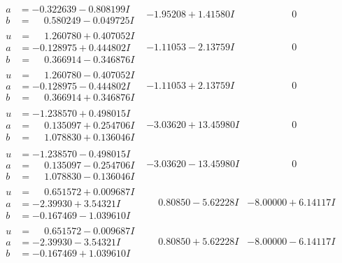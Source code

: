 \documentclass[1p]{elsarticle_modified}
\theoremstyle{definition}
\begin{document}
$$\begin{array}{c|c|c}
\begin{aligned}
a &= -0.322639 - 0.808199 I \\
b &= \phantom{-}0.580249 - 0.049725 I\end{aligned}
 & -1.95208 + 1.41580 I & \phantom{-0.000000 } 0 \\ \hline\begin{aligned}
u &= \phantom{-}1.260780 + 0.407052 I \\
a &= -0.128975 + 0.444802 I \\
b &= \phantom{-}0.366914 - 0.346876 I\end{aligned}
 & -1.11053 - 2.13759 I & \phantom{-0.000000 } 0 \\ \hline\begin{aligned}
u &= \phantom{-}1.260780 - 0.407052 I \\
a &= -0.128975 - 0.444802 I \\
b &= \phantom{-}0.366914 + 0.346876 I\end{aligned}
 & -1.11053 + 2.13759 I & \phantom{-0.000000 } 0 \\ \hline\begin{aligned}
u &= -1.238570 + 0.498015 I \\
a &= \phantom{-}0.135097 + 0.254706 I \\
b &= \phantom{-}1.078830 + 0.136046 I\end{aligned}
 & -3.03620 + 13.45980 I & \phantom{-0.000000 } 0 \\ \hline\begin{aligned}
u &= -1.238570 - 0.498015 I \\
a &= \phantom{-}0.135097 - 0.254706 I \\
b &= \phantom{-}1.078830 - 0.136046 I\end{aligned}
 & -3.03620 - 13.45980 I & \phantom{-0.000000 } 0 \\ \hline\begin{aligned}
u &= \phantom{-}0.651572 + 0.009687 I \\
a &= -2.39930 + 3.54321 I \\
b &= -0.167469 - 1.039610 I\end{aligned}
 & \phantom{-}0.80850 - 5.62228 I & -8.00000 + 6.14117 I \\ \hline\begin{aligned}
u &= \phantom{-}0.651572 - 0.009687 I \\
a &= -2.39930 - 3.54321 I \\
b &= -0.167469 + 1.039610 I\end{aligned}
 & \phantom{-}0.80850 + 5.62228 I & -8.00000 - 6.14117 I \\ \hline\begin{aligned}

\end{aligned}
\end{array}$$
\end{document}
